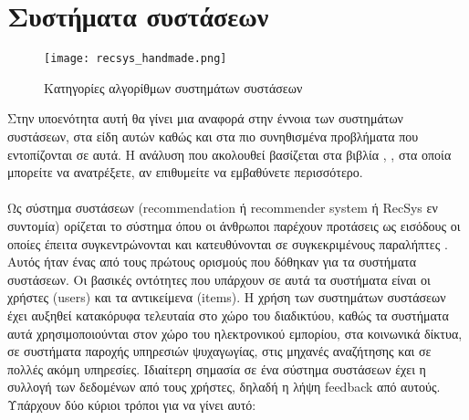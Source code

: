 \section{Συστήματα συστάσεων}
\label{rec_sys_chap}
\begin{figure}[H]
	\centering
	\texttt{[image: recsys\_handmade.png]}
	\caption{Κατηγορίες αλγορίθμων συστημάτων συστάσεων}
	\label{fig:rstypes}
\end{figure}
\noindent
Στην υποενότητα αυτή θα γίνει μια αναφορά στην έννοια των συστημάτων συστάσεων, στα είδη αυτών καθώς και στα πιο συνηθισμένα προβλήματα που εντοπίζονται σε αυτά. Η ανάλυση που ακολουθεί βασίζεται στα βιβλία \cite{falkPracticalRecommenderSystems2019}, \cite{aggarwalRecommenderSystems2016}, \cite{ricciRecommenderSystemsHandbook2011} στα οποία μπορείτε να ανατρέξετε, αν επιθυμείτε να εμβαθύνετε περισσότερο.\\\\
Ως σύστημα συστάσεων (recommendation ή recommender system ή RecSys εν συντομία) ορίζεται το σύστημα όπου οι άνθρωποι παρέχουν προτάσεις ως εισόδους οι οποίες έπειτα συγκεντρώνονται και κατευθύνονται σε συγκεκριμένους παραλήπτες \cite{resnickRecommenderSystems1997}. Αυτός ήταν ένας από τους πρώτους ορισμούς που δόθηκαν για τα συστήματα συστάσεων. Οι βασικές οντότητες που υπάρχουν σε αυτά τα συστήματα είναι οι χρήστες (users) και τα αντικείμενα (items). Η χρήση των συστημάτων συστάσεων έχει αυξηθεί κατακόρυφα τελευταία στο χώρο του διαδικτύου, καθώς τα συστήματα αυτά χρησιμοποιούνται στον χώρο του ηλεκτρονικού εμπορίου, στα κοινωνικά δίκτυα, σε συστήματα παροχής υπηρεσιών ψυχαγωγίας, στις μηχανές αναζήτησης και σε πολλές ακόμη υπηρεσίες.
Ιδιαίτερη σημασία σε ένα σύστημα συστάσεων έχει η συλλογή των δεδομένων από τους χρήστες, δηλαδή η λήψη feedback από αυτούς. Υπάρχουν δύο κύριοι τρόποι για να γίνει αυτό:
